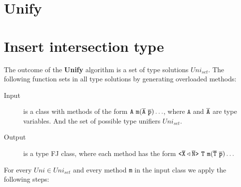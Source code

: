 \documentclass[a4paper,USenglish,cleveref, autoref, thm-restate]{lipics-v2021}
\begin{document}
\section{Unify}
\label{sec:unify-1}




\section{Insert intersection type}
\label{sec:insert-inters-type}

The outcome of the \textbf{Unify} algorithm is a set of type solutions $Uni_{set}$.
The following function sets in all type solutions by generating overloaded methods:

\begin{description}
\item[Input] is a class with methods of the form%
$\mathtt{A\ m(\overline{\tt A}\ \overline{\tt p})\ldots}$, where $\mathtt{A}$ and $\mathtt{\overline{\tt A}}$ are type variables.
And the set of possible type unifiers $Uni_{set}$.
\item[Output] is a type FJ class, where each method has the form
$\mathtt{\exptype{}{\ol{X} \triangleleft \ol{N}}\ T\ m(\ol{T}\ \ol{p})\ldots}$
\end{description}


For every $Uni \in Uni_{set}$ and every method \texttt{m} in the input class we apply the following steps:
\end{document}
